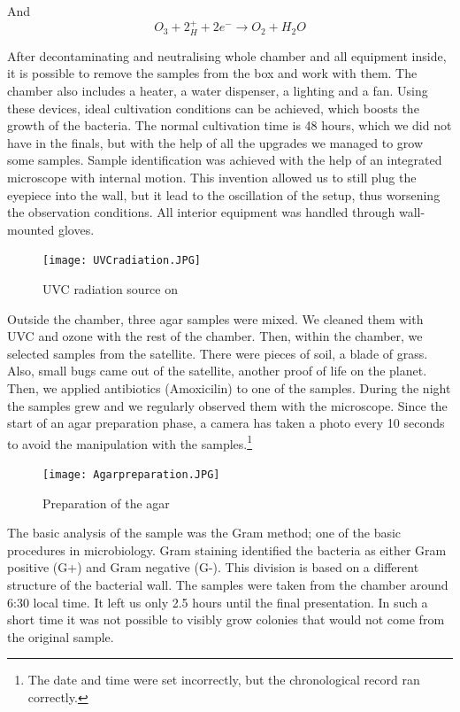 \documentclass{cfp}
\begin{document}
\par And
\begin{equation}
O_3 + 2_H^+ + 2e^- \xrightarrow{} O_2 + H_2O
\end{equation}
\par After decontaminating and neutralising whole chamber and all equipment inside, it is possible to remove the samples from the box and work with them. The chamber also includes a heater, a water dispenser, a lighting and a fan. Using these devices, ideal cultivation conditions can be achieved, which boosts the growth of the bacteria. The normal cultivation time is 48 hours, which we did not have in the finals, but with the help of all the upgrades we managed to grow some samples. Sample identification was achieved with the help of an integrated microscope with internal motion. This invention allowed us to still plug the eyepiece into the wall, but it lead to the oscillation of the setup, thus worsening the observation conditions. All interior equipment was handled through wall-mounted gloves.
\begin{figure}[!h]
\centering
\caption{UVC radiation source on}
\texttt{[image: UVCradiation.JPG]}
\end{figure}
\par
Outside the chamber, three agar samples were mixed. We cleaned them with UVC and ozone with the rest of the chamber. Then, within the chamber, we selected samples from the satellite. There were pieces of soil, a blade of grass. Also, small bugs came out of the satellite, another proof of life on the planet. Then, we applied antibiotics (Amoxicilin) to one of the samples. During the night the samples grew and we regularly observed them with the microscope. Since the start of an agar preparation phase, a camera has taken a photo every 10 seconds to avoid the manipulation with the samples.\footnote{The date and time were set incorrectly, but the chronological record ran correctly.}
\begin{figure}[!h]
\centering
\caption{Preparation of the agar}
\texttt{[image: Agarpreparation.JPG]}
\end{figure}
\par The basic analysis of the sample was the Gram method; one of the basic procedures in microbiology. Gram staining identified the bacteria as either Gram positive (G+) and Gram negative (G-). This division is based on a different structure of the bacterial wall. The samples were taken from the chamber around 6:30 local time. It left us only 2.5 hours until the final presentation. In such a short time it was not possible to visibly grow colonies that would not come from the original sample.
\end{document}
